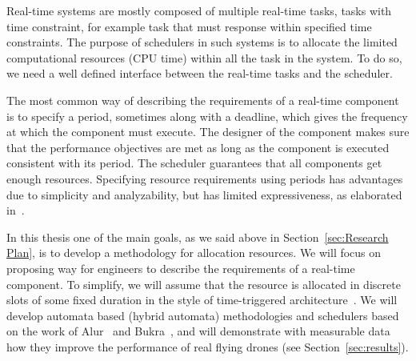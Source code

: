 \documentclass[11pt]{article}
\begin{document}
Real-time systems are mostly composed of multiple real-time tasks, tasks with time constraint, for example task that must response within specified time constraints.
The purpose of schedulers in such systems is to allocate the limited computational resources (CPU time) within all the task in the system. To do so, we need a well defined  interface between the real-time tasks and the scheduler.

The most common way of describing the requirements of a real-time component is to specify a period, sometimes along with a deadline, which gives the frequency at which the component must execute. The designer of the component makes sure that the performance objectives are met as long as the component is executed consistent with its period. The scheduler guarantees that all components get enough resources.
Specifying resource requirements using periods has advantages due to simplicity and analyzability, but has limited expressiveness, as elaborated in~\cite{RTComposer}. 

In this thesis one of the main goals, as we said above in Section~\ref{sec:Research Plan}, is to develop a methodology for allocation resources. We will focus on proposing way for engineers to describe the requirements of a real-time component.
To simplify, we will assume that the resource is allocated in discrete slots of some fixed duration in the style of time-triggered architecture~\cite{RTComposer}.
We will develop automata based (hybrid automata) methodologies and schedulers based on the work of Alur~\cite{RTComposer} and Bukra~\cite{Merav}, and will demonstrate with measurable data how they improve the performance of real flying drones (see Section~\ref{sec:results}).
\end{document}
